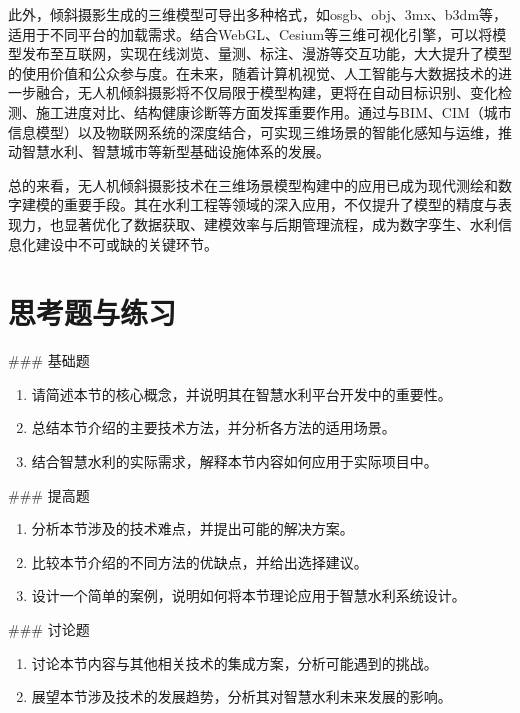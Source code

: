 此外，倾斜摄影生成的三维模型可导出多种格式，如osgb、obj、3mx、b3dm等，适用于不同平台的加载需求。结合WebGL、Cesium等三维可视化引擎，可以将模型发布至互联网，实现在线浏览、量测、标注、漫游等交互功能，大大提升了模型的使用价值和公众参与度。在未来，随着计算机视觉、人工智能与大数据技术的进一步融合，无人机倾斜摄影将不仅局限于模型构建，更将在自动目标识别、变化检测、施工进度对比、结构健康诊断等方面发挥重要作用。通过与BIM、CIM（城市信息模型）以及物联网系统的深度结合，可实现三维场景的智能化感知与运维，推动智慧水利、智慧城市等新型基础设施体系的发展。

总的来看，无人机倾斜摄影技术在三维场景模型构建中的应用已成为现代测绘和数字建模的重要手段。其在水利工程等领域的深入应用，不仅提升了模型的精度与表现力，也显著优化了数据获取、建模效率与后期管理流程，成为数字孪生、水利信息化建设中不可或缺的关键环节。

\section{思考题与练习}

\#\#\# 基础题

\begin{enumerate}
\def\labelenumi{\arabic{enumi}.}
\tightlist
\item
  请简述本节的核心概念，并说明其在智慧水利平台开发中的重要性。
\item
  总结本节介绍的主要技术方法，并分析各方法的适用场景。
\item
  结合智慧水利的实际需求，解释本节内容如何应用于实际项目中。
\end{enumerate}

\#\#\# 提高题

\begin{enumerate}
\def\labelenumi{\arabic{enumi}.}
\setcounter{enumi}{3}
\tightlist
\item
  分析本节涉及的技术难点，并提出可能的解决方案。
\item
  比较本节介绍的不同方法的优缺点，并给出选择建议。
\item
  设计一个简单的案例，说明如何将本节理论应用于智慧水利系统设计。
\end{enumerate}

\#\#\# 讨论题

\begin{enumerate}
\def\labelenumi{\arabic{enumi}.}
\setcounter{enumi}{6}
\tightlist
\item
  讨论本节内容与其他相关技术的集成方案，分析可能遇到的挑战。
\item
  展望本节涉及技术的发展趋势，分析其对智慧水利未来发展的影响。
\end{enumerate}

